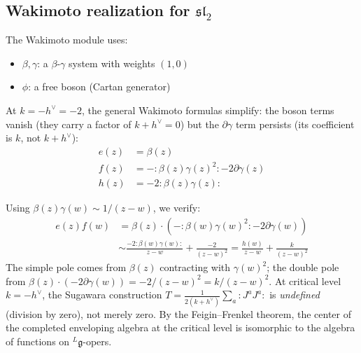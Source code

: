 \subsection{\texorpdfstring{Wakimoto realization for $\mathfrak{sl}_2$}{Wakimoto realization for sl-2}}

\begin{construction}[Wakimoto for $\mathfrak{sl}_2$ at $k=-2$]
The Wakimoto module uses:
\begin{itemize}
\item $\beta, \gamma$: a $\beta$-$\gamma$ system with weights $(1,0)$
\item $\phi$: a free boson (Cartan generator)
\end{itemize}

At $k = -h^\vee = -2$, the general Wakimoto formulas simplify:
the boson terms vanish (they carry a factor of $k + h^\vee = 0$) but the $\partial\gamma$ term
persists (its coefficient is $k$, not $k + h^\vee$):
\begin{align}
e(z) &= \beta(z) \\
f(z) &= -{:}\beta(z)\gamma(z)^2{:} - 2\partial\gamma(z) \\
h(z) &= -2{:}\beta(z)\gamma(z){:}
\end{align}
\end{construction}

\begin{verification}
Using $\beta(z)\gamma(w) \sim 1/(z-w)$, we verify:
\begin{align}
e(z)f(w) &= \beta(z) \cdot (-{:}\beta(w)\gamma(w)^2{:} - 2\partial\gamma(w)) \\
&\sim \frac{-2{:}\beta(w)\gamma(w){:}}{z-w} + \frac{-2}{(z-w)^2}
= \frac{h(w)}{z-w} + \frac{k}{(z-w)^2}
\end{align}
The simple pole comes from $\beta(z)$ contracting with $\gamma(w)^2$; the double pole from $\beta(z)\cdot(-2\partial\gamma(w)) = -2/(z-w)^2 = k/(z-w)^2$.  At critical level $k = -h^\vee$, the Sugawara construction $T = \frac{1}{2(k+h^\vee)}\sum_a {:}J^a J^a{:}$ is \emph{undefined} (division by zero), not merely zero.
By the Feigin--Frenkel theorem, the center of the completed enveloping algebra at the critical level is isomorphic to the algebra of functions on ${}^L\mathfrak{g}$-opers.
\end{verification}

